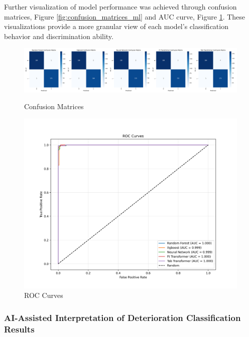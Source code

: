 Further visualization of model performance was achieved through confusion matrices, Figure \ref{fig:confusion_matrices_ml} and AUC curve, Figure \ref{fig:roc_curves_ml}. These visualizations provide a more granular view of each model's classification behavior and discrimination ability.

\begin{figure}[httpb] %
    \centering
    \begin{minipage}{0.45\textwidth}
        \centering
        \includegraphics[width=\textwidth]{../images/ml_confusion_matrices.png} %
        \caption{Confusion Matrices}
        \label{fig:confusion_matrices_ml}
    \end{minipage}
    \hfill
    \begin{minipage}{0.45\textwidth}
        \centering
        \includegraphics[width=\textwidth]{../images/ml_roc_curves.png} %
        \caption{ROC Curves}
        \label{fig:roc_curves_ml}
    \end{minipage}
\end{figure}

\subsubsection{AI-Assisted Interpretation of Deterioration Classification Results}

